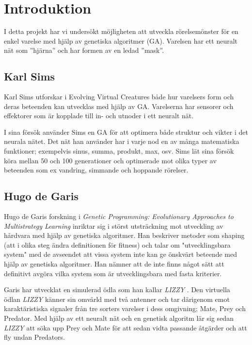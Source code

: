 \documentclass[titlepage, twocolumn, a4paper, 11pt, swedish]{article}
\begin{document}
\cleardoublepage
\newpage
\onecolumn
\tableofcontents
\cleardoublepage
\twocolumn
\cfoot{\thepage}


\section{Introduktion}

I detta projekt har vi undersökt möjligheten att utveckla rörelsemönster för en enkel varelse med hjälp av genetiska algoritmer (GA). Varelsen har ett neuralt nät som ”hjärna” och har formen av en ledad ”mask”.

\subsection{Karl Sims}
Karl Sims utforskar i Evolving Virtual Creatures \cite{sims} både hur varelsers form och deras beteenden kan utvecklas med hjälp av GA. Varelserna har sensorer och effektorer som är kopplade till in- och utnoder i ett neuralt nät. 

I sina försök använder Sims en GA för att optimera både struktur och vikter i det neurala nätet. Det nät han använder har i varje nod en av många matematiska funktioner; exempelvis sinus, summa, produkt, max, osv. Sims lät sina försök köra mellan 50 och 100 generationer och optimerade mot olika typer av beteenden som ex vandring, simmande och hoppande rörelser. 

\subsection{Hugo de Garis}
Hugo de Garis forskning i \textit{Genetic Programming: Evolutionary Approaches to Multistrategy Learning} \cite{garis} inriktar sig i störst utsträckning mot utveckling av hårdvara med hjälp av genetiska algoritmer. Han beskriver metoder som shaping (att i olika steg ändra definitionen för fitness) och talar om "utvecklingsbara system" med de avseendet att vissa system inte kan ge önskvärt beteende med hjälp av genetiska algoritmer. Han nämner att de inte finns något sätt att definitivt avgöra vilka system som är utvecklingsbara med fasta kriterier.

Garis har utvecklat en simulerad ödla som han kallar \textit{LIZZY} \cite{garis}. Den virtuella ödlan \textit{LIZZY} känner sin omvärld med två antenner och tar därigenom emot karaktäristiska signaler från tre sorters varelser i dess omgivning; Mate, Prey och Predator. Med hjälp av ett neuralt nät och en genetisk algoritm lär sig sedan \textit{LIZZY} att söka upp Prey och Mate för att sedan vidta passande åtgärder och att fly undan Predators.
\end{document}
